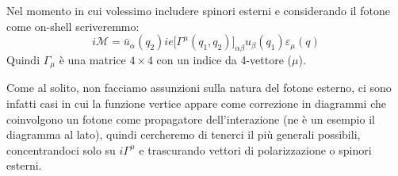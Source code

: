 \documentclass[../main.tex]{subfiles}
\begin{document}
\begin{nota}
    Nel momento in cui volessimo includere spinori esterni e considerando il fotone come on-shell scriveremmo:
    \[
    i\mathscr{M} =\bar u_\alpha(q_2) ie\bigl[ \Gamma^\mu(q_1,q_2)\bigr]_{\alpha\beta} u_\beta(q_1) \varepsilon_\mu(q)
    \]
    Quindi $\Gamma_\mu$ è una matrice $4\times4$ con un indice da 4-vettore ($\mu$).
    
    
    Come al solito, non facciamo assunzioni sulla natura del fotone esterno, ci sono infatti casi in cui la funzione vertice appare come correzione in diagrammi che coinvolgono un fotone come propagatore dell'interazione (ne è un esempio il diagramma al lato), quindi cercheremo di tenerci il più generali possibili, concentrandoci solo su $i\Gamma^\mu$ e trascurando vettori di polarizzazione o spinori esterni.
\end{nota}
\end{document}
